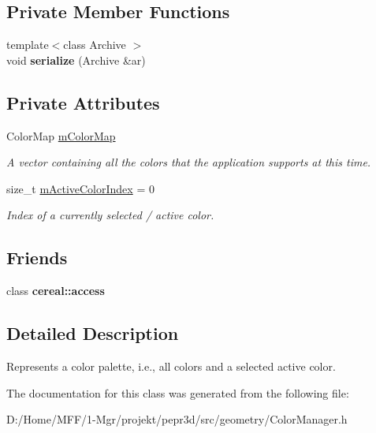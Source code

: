\subsection*{Private Member Functions}
\begin{DoxyCompactItemize}
\item 
\mbox{\label{classpepr3d_1_1_color_manager_a3fc86df9e3fcb8ac2efaedcd0f180676}} 
{\footnotesize template$<$class Archive $>$ }\\void {\bfseries serialize} (Archive \&ar)
\end{DoxyCompactItemize}
\subsection*{Private Attributes}
\begin{DoxyCompactItemize}
\item 
\mbox{\label{classpepr3d_1_1_color_manager_ad6b9cb7395ea796012aec61e6292cdfd}} 
Color\+Map \mbox{\hyperlink{classpepr3d_1_1_color_manager_ad6b9cb7395ea796012aec61e6292cdfd}{m\+Color\+Map}}
\begin{DoxyCompactList}\small\item\em A vector containing all the colors that the application supports at this time. \end{DoxyCompactList}\item 
\mbox{\label{classpepr3d_1_1_color_manager_a29706f2b1a4d4870f4d9398c4830f9ec}} 
size\+\_\+t \mbox{\hyperlink{classpepr3d_1_1_color_manager_a29706f2b1a4d4870f4d9398c4830f9ec}{m\+Active\+Color\+Index}} = 0
\begin{DoxyCompactList}\small\item\em Index of a currently selected / active color. \end{DoxyCompactList}\end{DoxyCompactItemize}
\subsection*{Friends}
\begin{DoxyCompactItemize}
\item 
\mbox{\label{classpepr3d_1_1_color_manager_ab2f44cbb59a08132f4c843e5225bba0e}} 
class {\bfseries cereal\+::access}
\end{DoxyCompactItemize}


\subsection{Detailed Description}
Represents a color palette, i.\+e., all colors and a selected active color. 

The documentation for this class was generated from the following file\+:\begin{DoxyCompactItemize}
\item 
D\+:/\+Home/\+M\+F\+F/1-\/\+Mgr/projekt/pepr3d/src/geometry/Color\+Manager.\+h\end{DoxyCompactItemize}

